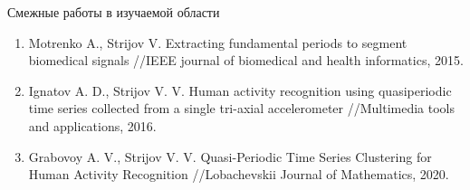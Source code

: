 \documentclass{beamer}
\begin{document}
\begin{frame}{Смежные работы в изучаемой области}
    \begin{enumerate}
	\item Motrenko A., Strijov V. Extracting fundamental periods to segment biomedical signals //IEEE journal of biomedical and health informatics, 2015.
	\item Ignatov A. D., Strijov V. V. Human activity recognition using quasiperiodic time series collected from a single tri-axial accelerometer //Multimedia tools and applications, 2016.
	\item Grabovoy A. V., Strijov V. V. Quasi-Periodic Time Series Clustering for Human Activity Recognition //Lobachevskii Journal of Mathematics, 2020.


\end{enumerate}
\end{frame}

\end{document}
